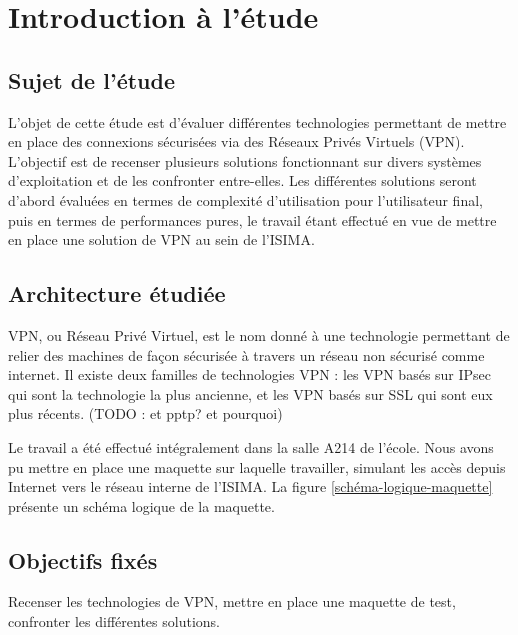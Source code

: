 \section{Introduction à l'étude}
\subsection{Sujet de l'étude}
L'objet de cette étude est d'évaluer différentes technologies permettant de mettre en place des connexions sécurisées via des Réseaux Privés Virtuels (VPN). L'objectif est de recenser plusieurs solutions fonctionnant sur divers systèmes d'exploitation et de les confronter entre-elles. Les différentes solutions seront d'abord évaluées en termes de complexité d'utilisation pour l'utilisateur final, puis en termes de performances pures, le travail étant effectué en vue de mettre en place une solution de VPN au sein de l'ISIMA.

\subsection{Architecture étudiée}
VPN, ou Réseau Privé Virtuel, est le nom donné à une technologie permettant de relier des machines de façon sécurisée à travers un réseau non sécurisé comme internet. Il existe deux familles de technologies VPN : les VPN basés sur IPsec qui sont la technologie la plus ancienne, et les VPN basés sur SSL qui sont eux plus récents. (TODO : et pptp? et pourquoi)

Le travail a été effectué intégralement dans la salle A214 de l'école. Nous avons pu mettre en place une maquette sur laquelle travailler, simulant les accès depuis Internet vers le réseau interne de l'ISIMA. La figure \ref{schéma-logique-maquette} présente un schéma logique de la maquette.

\subsection{Objectifs fixés}
Recenser les technologies de VPN, mettre en place une maquette de test, confronter les différentes solutions.

\pagebreak
